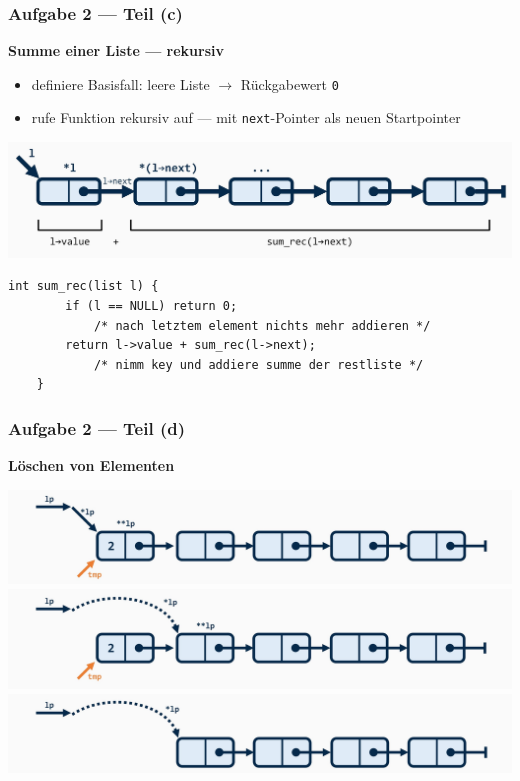 \documentclass{beamer}
\begin{document}
\begin{frame}[fragile] \frametitle{Aufgabe 2 --- Teil (c)}
	\textbf{Summe einer Liste --- rekursiv}
	\begin{itemize}
		\item definiere Basisfall: leere Liste $\to$ Rückgabewert \texttt{0}
		\item rufe Funktion rekursiv auf --- mit \texttt{next}-Pointer als neuen Startpointer
	\end{itemize}

	\pause
	
	\begin{center}
		\includegraphics[width=0.8\linewidth]{tut06-graphics/tut06-summe-rec}
	\end{center}

	\pause
		
	\begin{lstlisting}[style=notebook]
	int sum_rec(list l) {
		if (l == NULL) return 0; 
			/* nach letztem element nichts mehr addieren */
		return l->value + sum_rec(l->next); 
			/* nimm key und addiere summe der restliste */
	}
	\end{lstlisting}
\end{frame}

\begin{frame}[fragile] \frametitle{Aufgabe 2 --- Teil (d)}
	\textbf{Löschen von Elementen}
	\begin{center}
		\includegraphics[width=\linewidth]{tut06-graphics/tut06-rmEvans-1} \\ \pause
		\includegraphics[width=\linewidth]{tut06-graphics/tut06-rmEvans-2} \\ \pause
		\includegraphics[width=\linewidth]{tut06-graphics/tut06-rmEvans-3}
	\end{center}
\end{frame}
\end{document}
